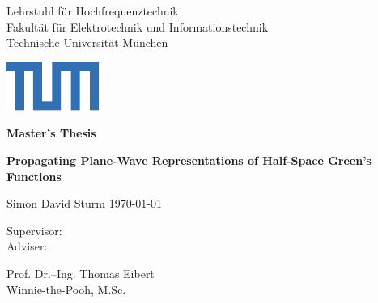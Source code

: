 \begin{titlepage}
	

	\newcommand{\UniversitaetLogoBreite}{19mm}
	\newcommand{\UniversitaetLogoHoehe}{1cm}

	\linespread{1}	
	\vspace*{-1cm}
    
	\setlength{\parindent}{0cm} 
	\begin{center}
		\begin{minipage}[l]{\textwidth-\UniversitaetLogoBreite}
			{ \footnotesize \color{TUMBlau}
				{\selectfont \small
					\textsf{Lehrstuhl für Hochfrequenztechnik\\
					Fakultät für Elektrotechnik und Informationstechnik\\
					Technische Universität München}\par}
			}
		\end{minipage}%
		\begin{minipage}[r]{\UniversitaetLogoBreite} %
			\includegraphics[width=\textwidth]{./titlepage/TUM_Logo_Web.pdf}
		\end{minipage}%
	\end{center}%
		
	\vspace{8cm}
	\Huge
	\textbf{Master's Thesis}
	\vspace{2cm}
	\LARGE
	\begin{flushleft}	
		\textbf{Propagating Plane-Wave Representations of Half-Space Green's Functions}
	\end{flushleft}
	\vspace{2cm}
	Simon David Sturm  \qquad \qquad \today \\[3cm] 
	\large	
	\parbox[b][3cm][t]{2.2cm}{
		Supervisor: \\
	    Adviser: }
	\parbox[b][3cm][t]{6cm}{
		Prof. Dr.--Ing. Thomas Eibert\\
		Winnie-the-Pooh, M.Sc.
		}				

\end{titlepage}	 
